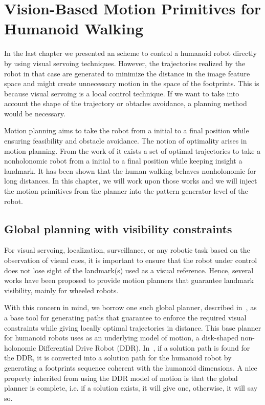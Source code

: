 \chapter{Vision-Based Motion Primitives for Humanoid Walking} 
\label{Chap:Visual-Planning}

In the last chapter we presented an scheme to control a humanoid robot directly by using visual servoing techniques. However, the trajectories realized by the robot in that case are generated to minimize the distance in the image feature space and might create unnecessary motion in the space of the footprints. This is because visual servoing is a local control technique. If we want to take into account the shape of the trajectory or obtacles avoidance, a planning method would be necessary.

Motion planning aims to take the robot from a initial to a final position while ensuring feasibility and obstacle avoidance. The notion of optimality arises in motion planning. From the work of \citep{Salaris:2010, jib-IJHR2010} it exists a set of optimal trajectories to take a nonholonomic robot from a initial to a final position while keeping insight a landmark. It has been shown that the human walking behaves nonholonomic for long distances. In this chapter, we will work upon those works and we will inject the motion primitives from the planner into the pattern generator level of the robot.

\section{Global planning with visibility constraints}

\label{sec:globalplanning}

For visual servoing, localization, surveillance, or any robotic task based on the observation of visual cues, it is important to ensure that the robot under control does not lose sight of the landmark(s) used as a visual reference. Hence, several works have been proposed to provide motion planners that guarantee landmark visibility, mainly for wheeled robots.

With this concern in mind, we borrow one such global planner, described in~\cite{jib-IJHR2010},  as a base tool for generating paths that guarantee to enforce the required visual constraints while giving locally optimal trajectories in distance. This base planner for humanoid robots uses as an underlying model of motion, a disk-shaped non-holonomic Differential Drive Robot (DDR). In~\cite{jib-IJHR2010}, if a solution path is found for the DDR, it is converted into a solution path for the humanoid robot by generating a footprints sequence coherent with the humanoid dimensions. A nice property inherited from using the DDR model of motion is that the global planner is complete, i.e.  if a solution exists, it will give one, otherwise, it will say so.

